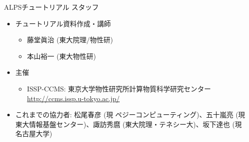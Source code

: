 \begin{frame}[t,fragile]{ALPSチュートリアル スタッフ}
  \begin{itemize}
    \setlength{\itemsep}{1em}
  \item チュートリアル資料作成・講師
    \begin{itemize}
    \item 藤堂眞治 (東大院理/物性研)
    \item 本山裕一 (東大物性研)
    \end{itemize}
  \item 主催
    \begin{itemize}
    \item ISSP-CCMS: 東京大学物性研究所計算物質科学研究センター \url{http://ccms.issp.u-tokyo.ac.jp/} \\[2em]
    \end{itemize}
  \item これまでの協力者: 松尾春彦 (現 ペジーコンピューティング)、五十嵐亮 (現 東大情報基盤センター)、諏訪秀麿 (東大院理・テネシー大)、坂下達也 (現 名古屋大学)
  \end{itemize}
\end{frame}

